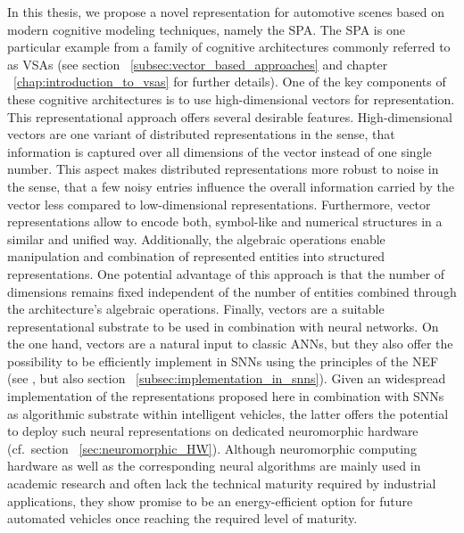 In this thesis, we propose a novel representation for automotive scenes based on modern cognitive modeling techniques, namely the \ac{SPA}.
The \ac{SPA} is one particular example from a family of cognitive architectures commonly referred to as \acp{VSA} (see section ~\ref{subsec:vector_based_approaches} and chapter ~\ref{chap:introduction_to_vsas} for further details).
One of the key components of these cognitive architectures is to use high-dimensional vectors for representation.
This representational approach offers several desirable features.
High-dimensional vectors are one variant of distributed representations in the sense, that information is captured over all dimensions of the vector instead of one single number.
This aspect makes distributed representations more robust to noise in the sense, that a few noisy entries influence the overall information carried by the vector less compared to low-dimensional representations.
Furthermore, vector representations allow to encode both, symbol-like and numerical structures in a similar and unified way.
Additionally, the algebraic operations enable manipulation and combination of represented entities into structured representations.
One potential advantage of this approach is that the number of dimensions remains fixed independent of the number of entities combined through the architecture's algebraic operations.
Finally, vectors are a suitable representational substrate to be used in combination with neural networks.
On the one hand, vectors are a natural input to classic \acp{ANN}, but they also offer the possibility to be efficiently implement in \acp{SNN} using the principles of the \ac{NEF} (see \cite{Eliasmith2013}, but also section ~\ref{subsec:implementation_in_snns}).
Given an widespread implementation of the representations proposed here in combination with \acp{SNN} as algorithmic substrate within intelligent vehicles, the latter offers the potential to deploy such neural representations on dedicated neuromorphic hardware (cf.\ section ~\ref{sec:neuromorphic_HW}).
Although neuromorphic computing hardware as well as the corresponding neural algorithms are mainly used in academic research and often lack the technical maturity required by industrial applications, they show promise to be an energy-efficient option for future automated vehicles once reaching the required level of maturity.


